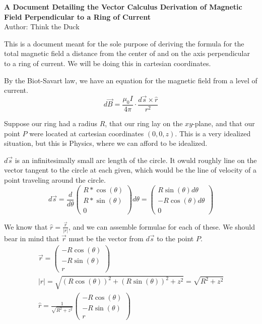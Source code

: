 \documentclass[12pt]{article}
\begin{document}
    \begin{center}
        \textbf{A Document Detailing the Vector Calculus Derivation of Magnetic Field Perpendicular to a Ring of Current}\\
        Author: Think the Duck
    \end{center}
    This is a document meant for the sole purpose of deriving the formula for the total magnetic field a distance from the center of and on the axis perpendicular to a ring of current.
    We will be doing this in cartesian coordinates.

    By the Biot-Savart law, we have an equation for the magnetic field from a level of current.
    \begin{equation}
        d\vec{B} = \frac{\mu_0 I}{4\pi} \cdot \frac{d\vec{s} \times \hat{r}}{r^2}
    \end{equation}

    Suppose our ring had a radius $R$, that our ring lay on the $xy$-plane, and that our point $P$ were located at cartesian coordinates $(0,0,z)$.
    This is a very idealized situation, but this is Physics, where we can afford to be idealized.
    
    $d\vec{s}$ is an infinitesimally small arc length of the circle. It owuld roughly line on the vector tangent to the circle at each given, which would be the line of velocity of a point traveling around the circle.
    \begin{equation}
        d\vec{s} = \frac{d}{d\theta} \begin{pmatrix}
            R*\cos(\theta)\\
            R*\sin(\theta)\\
            0
        \end{pmatrix} d\theta
            =   \begin{pmatrix}
                R\sin(\theta) d\theta\\
                -R\cos(\theta) d\theta\\
                0
            \end{pmatrix}
    \end{equation}

    We know that $\hat{r} = \frac{\vec{r}}{\left|r\right|}$, and we can assemble formulae for each of these.
    We should bear in mind that $\vec{r}$ must be the vector from $d\vec{s}$ to the point $P$. 
    \begin{gather}
        \vec{r} = \begin{pmatrix}
            -R\cos(\theta)\\
            -R\sin(\theta)\\
            r
        \end{pmatrix}\\
        \left|r\right| = \sqrt{(R\cos(\theta))^2 + (R\sin(\theta))^2 + z^2}
            =   \sqrt{R^2 + z^2}\\
        \hat{r} = \frac{1}{\sqrt{R^2 + z^2}} \begin{pmatrix}
            -R\cos(\theta)\\
            -R\sin(\theta)\\
            r
        \end{pmatrix}
    \end{gather}
\end{document}
